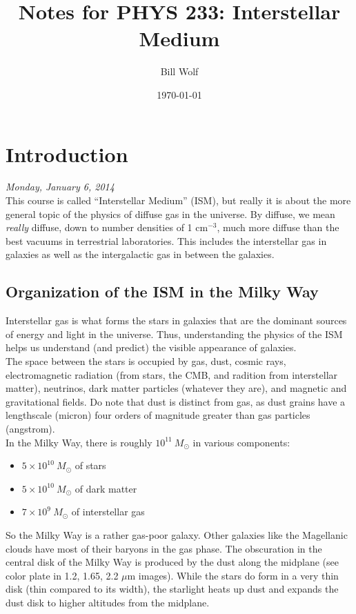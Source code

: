 \documentclass[10pt]{article}
\title{Notes for PHYS 233: Interstellar Medium}
\author{Bill Wolf}
\date{\today}
\numberwithin{equation}{section}
\newcommand{\n}{\noindent}
\begin{document}
\vfill\maketitle\vfill \newpage

\tableofcontents \newpage

\section{Introduction}
\emph{Monday, January 6, 2014}\\

\n This course is called ``Interstellar Medium'' (ISM), but really it is about
the more general topic of the physics of diffuse gas in the universe. By
diffuse, we mean \emph{really} diffuse, down to number densities of 1
cm$^{-3}$, much more diffuse than the best vacuums in terrestrial laboratories.
This includes the interstellar gas in galaxies as well as the intergalactic gas
in between the galaxies.

\subsection{Organization of the ISM in the Milky Way} %
\label{sub:a_first_look}
Interstellar gas is what forms the stars in galaxies that are the dominant
sources of energy and light in the universe. Thus, understanding the physics of
the ISM helps us understand (and predict) the visible appearance of galaxies.\\

\noindent The space between the stars is occupied by gas, dust, cosmic rays,
electromagnetic radiation (from stars, the CMB, and radition from interstellar
matter), neutrinos, dark matter particles (whatever they are), and magnetic and
gravitational fields. Do note that dust is distinct from gas, as dust grains
have a lengthscale (micron) four orders of magnitude greater than gas particles
(angstrom).\\

\noindent In the Milky Way, there is roughly $10^{11}\ M_\odot$ in various
components:
\begin{itemize}
  \item $5\times 10^{10}\ M_\odot$ of stars
  \item $5\times 10^{10}\ M_\odot$ of dark matter
  \item $7\times 10^{9}\ M_\odot$ of interstellar gas
\end{itemize}
So the Milky Way is a rather gas-poor galaxy. Other galaxies like the
Magellanic clouds have most of their baryons in the gas phase. The obscuration
in the central disk of the Milky Way is produced by the dust along the midplane
(see color plate in 1.2, 1.65, 2.2 $\mu$m images). While the stars do form in a
very thin disk (thin compared to its width), the starlight heats up dust and
expands the dust disk to higher altitudes from the midplane.\\
\end{document}
